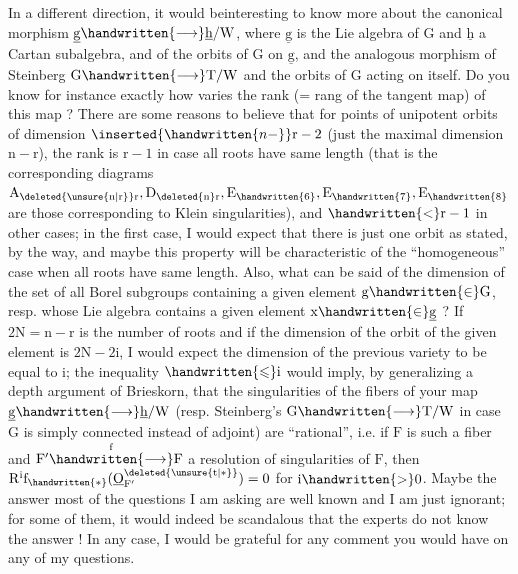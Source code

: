 In a different direction, it would be\handwritten{\raisebox{.6ex}{$\vert$}}interesting to know more about the canonical morphism $\underline{\mathrm{g}}\handwritten{\longrightarrow}\underline{\mathrm{h}}/\mathrm{W}$, where $\underline{\mathrm{g}}$ is the Lie algebra of $\mathrm{G}$ and $\underline{\mathrm{h}}$ a Cartan subalgebra, and of the orbits of $\mathrm{G}$ on $\underline{\mathrm{g}}$, and the analogous morphism of Steinberg $\mathrm{G}\handwritten{\longrightarrow}\mathrm{T}/\mathrm{W}$ and the orbits of $\mathrm{G}$ acting on itself. Do you know for instance exactly how varies the rank (= rang of the tangent map) of this  map ? There are some reasons to believe that  for points of unipotent orbits of dimension $\inserted{\handwritten{n-}}\mathrm{r}-2$ (just  the maximal dimension $\mathrm{n}-\mathrm{r}$), the rank is $\mathrm{r}-1$ in case all roots have same length (that is the corresponding diagrams $\mathrm{A}_{\deleted{\unsure{\mathrm{n}|\mathrm{r}}}\mathrm{r}},\mathrm{D}_{\deleted{\mathrm{n}}\mathrm{r}},\mathrm{E}_{\handwritten{6}},\mathrm{E}_{\handwritten{7}},\mathrm{E}_{\handwritten{8}}$ are those corresponding to Klein singularities), and $\handwritten{<}\mathrm{r}-1$ in  other cases; in the first case, I would expect that there is just one orbit as stated, by the way, and maybe this property will be characteristic of the ``homogeneous'' case when all roots have same length. Also, what can be said of the dimension of the set of all Borel subgroups containing a given element $\mathrm{g}\handwritten{\in}\mathrm{G}$, resp. whose Lie algebra contains a given element $\mathrm{x}\handwritten{\in}\underline{\mathrm{g}}$ ? If $2\mathrm{N}=\mathrm{n}-\mathrm{r}$ is the number of roots and if the dimension of the orbit of the given element is $2\mathrm{N}-2\mathrm{i}$, I would expect the dimension of the previous variety to be equal to $\mathrm{i}$; the inequality $\handwritten{\leqslant}\mathrm{i}$ would imply, by generalizing a depth argument of Brieskorn, that the singularities of the fibers of your map $\underline{\mathrm{g}}\handwritten{\longrightarrow}\underline{\mathrm{h}}/\mathrm{W}$ (resp. Steinberg's $\mathrm{G}\handwritten{\longrightarrow}\mathrm{T}/\mathrm{W}$ in case $\mathrm{G}$ is simply connected instead of adjoint) are ``rational'', i.e. if $\mathrm{F}$ is such a fiber and $\mathrm{F}'\overset{\mathrm{f}}{\handwritten{\longrightarrow}}\mathrm{F}$ a resolution of singularities of $\mathrm{F}$, then $\mathrm{R}^{\mathrm{i}}\mathrm{f}_{\handwritten{*}}(\underline{\mathrm{O}}_{\mathrm{F}'}^{\deleted{\unsure{\mathrm{t}|*}}})=0$ for $\mathrm{i}\handwritten{>}0$. Maybe the answer  most of the questions I am asking are well known and I am just ignorant; for some of them, it would indeed be scandalous that the experts do not know the answer ! In any case, I would be grateful for any comment you would have on any of my questions.

